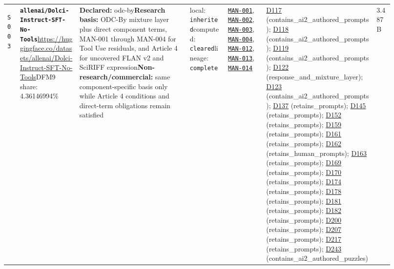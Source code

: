 \documentclass[9pt,a4paper]{article}
\newcommand{\srcid}[1]{\hypertarget{src:#1}{\texttt{#1}}}
\begin{document}
\begin{landscape}
\begin{longtable}{@{}L{0.03\linewidth}L{0.14\linewidth}L{0.26\linewidth}L{0.09\linewidth}L{0.09\linewidth}L{0.265\linewidth}L{0.045\linewidth}@{}}
\srcid{S003} & \textbf{\nolinkurl{allenai/Dolci-Instruct-SFT-No-Tools}}\newline \url{https://huggingface.co/datasets/allenai/Dolci-Instruct-SFT-No-Tools}\newline DFM9 share: 4.36146994\% & \textbf{Declared:} odc-by\newline \textbf{Research basis:} ODC-By mixture layer plus direct component terms, MAN-001 through MAN-004 for Tool Use residuals, and Article 4 for uncovered FLAN v2 and SciRIFF expression\newline \textbf{Non-research/commercial:} same component-specific basis only while Article 4 conditions and direct-term obligations remain satisfied & local: \texttt{inherited}\newline computed: \texttt{cleared}\newline lineage: \texttt{complete} & \hyperlink{manual:MAN-001}{\texttt{MAN-001}}, \hyperlink{manual:MAN-002}{\texttt{MAN-002}}, \hyperlink{manual:MAN-003}{\texttt{MAN-003}}, \hyperlink{manual:MAN-004}{\texttt{MAN-004}}, \hyperlink{manual:MAN-012}{\texttt{MAN-012}}, \hyperlink{manual:MAN-013}{\texttt{MAN-013}}, \hyperlink{manual:MAN-014}{\texttt{MAN-014}} & \hyperlink{dep:D117}{D117} (contains\_ai2\_authored\_prompts); \hyperlink{dep:D118}{D118} (contains\_ai2\_authored\_prompts); \hyperlink{dep:D119}{D119} (contains\_ai2\_authored\_prompts); \hyperlink{dep:D122}{D122} (response\_and\_mixture\_layer); \hyperlink{dep:D123}{D123} (contains\_ai2\_authored\_prompts); \hyperlink{dep:D137}{D137} (retains\_prompts); \hyperlink{dep:D145}{D145} (retains\_prompts); \hyperlink{dep:D152}{D152} (retains\_prompts); \hyperlink{dep:D159}{D159} (retains\_prompts); \hyperlink{dep:D161}{D161} (retains\_prompts); \hyperlink{dep:D162}{D162} (retains\_human\_prompts); \hyperlink{dep:D163}{D163} (retains\_prompts); \hyperlink{dep:D169}{D169} (retains\_prompts); \hyperlink{dep:D170}{D170} (retains\_prompts); \hyperlink{dep:D174}{D174} (retains\_prompts); \hyperlink{dep:D178}{D178} (retains\_prompts); \hyperlink{dep:D181}{D181} (retains\_prompts); \hyperlink{dep:D182}{D182} (retains\_prompts); \hyperlink{dep:D200}{D200} (retains\_prompts); \hyperlink{dep:D207}{D207} (retains\_prompts); \hyperlink{dep:D217}{D217} (retains\_prompts); \hyperlink{dep:D243}{D243} (contains\_ai2\_authored\_puzzles) & 3.487B \\

\end{longtable}
\end{landscape}
\end{document}
